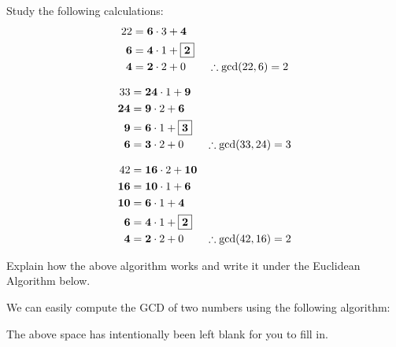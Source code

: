 \documentclass{ximera}
\begin{document}
\begin{exercise} Study the following calculations:
\begin{align*}
  22 &= \boldsymbol{6}\cdot 3 + \boldsymbol{4}\\
  \boldsymbol{6} &= \boldsymbol{4} \cdot 1 + \fbox{$\boldsymbol{2}$}\\
  \boldsymbol{4} &= \boldsymbol{2} \cdot 2 + 0 \qquad
\therefore \gcd(22,6) = 2
\end{align*}

\begin{align*}
33 &= \boldsymbol{24}\cdot 1 + \boldsymbol{9}\\
\boldsymbol{24} &= \boldsymbol{9} \cdot 2 + \boldsymbol{6}\\
\boldsymbol{9} &= \boldsymbol{6} \cdot 1 + \fbox{$\boldsymbol{3}$}\\
\boldsymbol{6} &= \boldsymbol{3} \cdot 2 + 0 \qquad \therefore \gcd(33,24) = 3 
\end{align*}

\begin{align*}
42 &= \boldsymbol{16}\cdot 2 + \boldsymbol{10}\\
\boldsymbol{16} &= \boldsymbol{10} \cdot 1 + \boldsymbol{6}\\
\boldsymbol{10} &= \boldsymbol{6} \cdot 1 + \boldsymbol{4}\\
\boldsymbol{6} &= \boldsymbol{4} \cdot 1 + \fbox{$\boldsymbol{2}$}\\
\boldsymbol{4} &= \boldsymbol{2} \cdot 2 + 0 \qquad \therefore \gcd(42,16) = 2 
\end{align*}

Explain how the above algorithm works and write it under the Euclidean
Algorithm below.
\end{exercise}


\begin{theorem} 
We can easily compute the GCD of two numbers using the following
algorithm:
\vspace{2in}

\end{theorem}
\noindent The above space has intentionally been left blank for you to
fill in.
\end{document}
